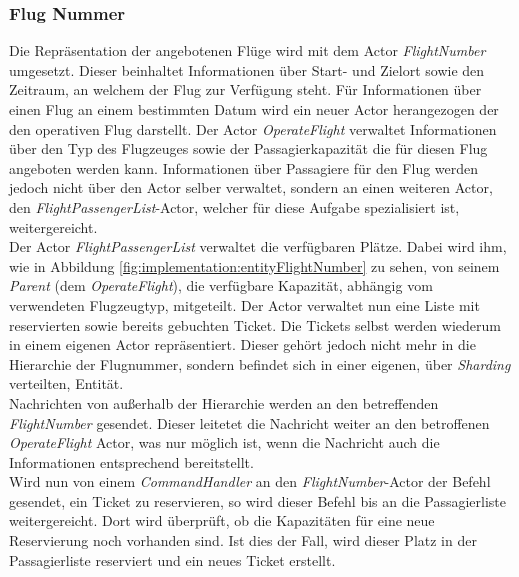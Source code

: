 \subsubsection{Flug Nummer}
Die Repräsentation der angebotenen Flüge  wird mit dem Actor \textit{FlightNumber} umgesetzt. Dieser beinhaltet Informationen über Start- und Zielort sowie den Zeitraum, an welchem der Flug zur Verfügung steht. Für Informationen über einen Flug an einem bestimmten Datum wird ein neuer Actor herangezogen der den operativen Flug darstellt. Der Actor \textit{OperateFlight} verwaltet Informationen über den Typ des Flugzeuges sowie der Passagierkapazität die für diesen Flug angeboten werden kann. Informationen über Passagiere für den Flug werden jedoch nicht über den Actor selber verwaltet, sondern an einen weiteren Actor, den \textit{FlightPassengerList}-Actor, welcher für diese Aufgabe spezialisiert ist, weitergereicht. \\
Der Actor \textit{FlightPassengerList} verwaltet die verfügbaren Plätze. Dabei wird ihm, wie in Abbildung \ref{fig:implementation:entityFlightNumber} zu sehen, von seinem \textit{Parent} (dem \textit{OperateFlight}), die verfügbare Kapazität, abhängig vom verwendeten Flugzeugtyp, mitgeteilt. Der Actor verwaltet nun eine Liste mit reservierten sowie bereits gebuchten Ticket. Die Tickets selbst werden wiederum in einem eigenen Actor repräsentiert. Dieser gehört jedoch nicht mehr in die Hierarchie der Flugnummer, sondern befindet sich in einer eigenen, über \textit{Sharding} verteilten, Entität. \\
Nachrichten von außerhalb der Hierarchie werden an den betreffenden \textit{FlightNumber} gesendet. Dieser leitetet die Nachricht weiter an den betroffenen \textit{OperateFlight} Actor, was nur möglich ist, wenn die Nachricht auch die Informationen entsprechend bereitstellt. \\
Wird nun von einem \textit{CommandHandler} an den \textit{FlightNumber}-Actor der Befehl gesendet, ein Ticket zu reservieren, so wird dieser Befehl bis an die Passagierliste weitergereicht. Dort wird überprüft, ob die Kapazitäten für eine neue Reservierung noch vorhanden sind. Ist dies der Fall, wird dieser Platz in der Passagierliste reserviert und ein neues Ticket erstellt. 

